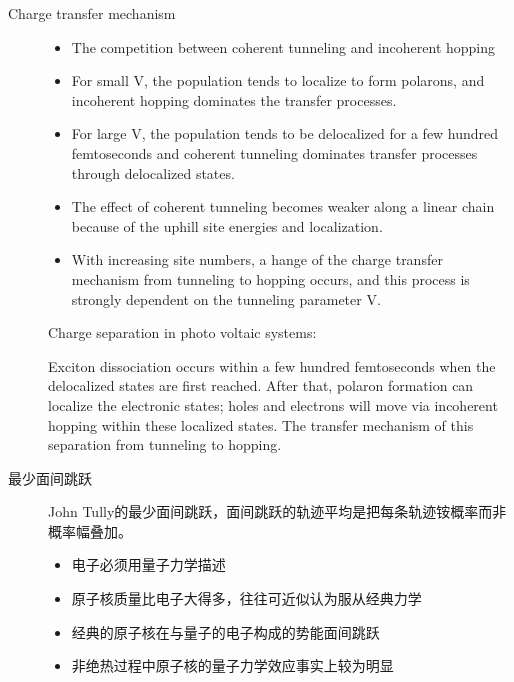 \begin{description}
	\item[Charge transfer mechanism]
	\begin{itemize}
		\item The competition between coherent tunneling and incoherent hopping
		\item For small V, the population tends to localize to form polarons, and incoherent hopping dominates the transfer processes.
		\item For large V, the population tends to be delocalized for a few hundred femtoseconds and coherent tunneling dominates transfer processes through delocalized states.
		\item The effect of coherent tunneling becomes weaker along a linear chain because of the uphill site energies and localization.
		\item With increasing site numbers, a hange of the charge transfer mechanism from tunneling to hopping occurs, and this process is strongly dependent on the tunneling parameter V.
	\end{itemize}

	Charge separation in photo voltaic systems:

	Exciton dissociation occurs within a few hundred femtoseconds when the delocalized states are first reached. After that, polaron formation can localize the electronic states; holes and electrons will move via incoherent hopping within these localized states. The transfer mechanism of this separation from tunneling to hopping.

	\item [最少面间跳跃] John Tully的最少面间跳跃，面间跳跃的轨迹平均是把每条轨迹铵概率而非概率幅叠加。
	\begin{itemize}
		\item 电子必须用量子力学描述

		\item 原子核质量比电子大得多，往往可近似认为服从经典力学

		\item 经典的原子核在与量子的电子构成的势能面间跳跃

		\item 非绝热过程中原子核的量子力学效应事实上较为明显
	\end{itemize}


	
\end{description}
